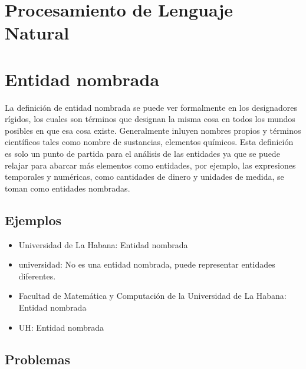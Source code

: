 \documentclass[runningheads]{llncs}
\begin{document}
\section{Procesamiento de Lenguaje Natural}


\section{Entidad nombrada}

La definición de entidad nombrada se puede ver formalmente en los designadores rígidos\cite{rigid_designator}, los cuales son términos que designan la misma cosa en todos los mundos posibles en que esa cosa existe. Generalmente inluyen nombres propios y términos científicos tales como nombre de sustancias, elementos químicos. Esta definición es solo un punto de partida para el análisis de las entidades ya que se puede relajar  para abarcar más elementos como entidades, por ejemplo, las expresiones temporales y numéricas, como cantidades de dinero y unidades de medida, se toman como entidades nombradas. 

\subsection{Ejemplos}

\begin{itemize}

\item Universidad de La Habana: Entidad nombrada
\item universidad: No es una entidad nombrada, puede representar entidades diferentes.
\item Facultad de Matemática y Computación de la Universidad de La Habana: Entidad nombrada
\item UH: Entidad nombrada
\end{itemize}

\subsection{Problemas}
\end{document}
